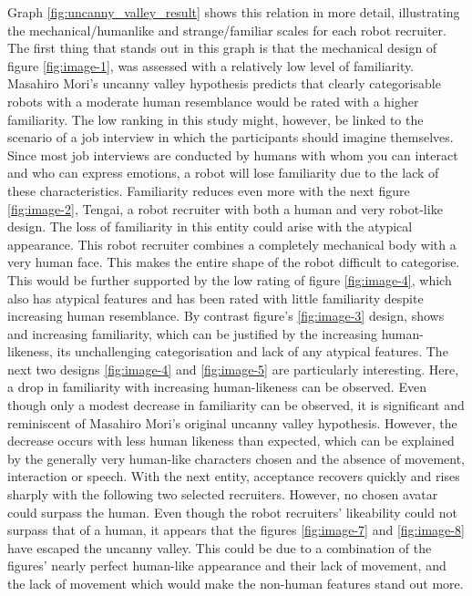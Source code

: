 Graph \ref{fig:uncanny_valley_result} shows this relation in more detail, illustrating the mechanical/humanlike and strange/familiar scales for each robot recruiter. The first thing that stands out in this graph is that the mechanical design of figure \ref{fig:image-1}, was assessed with a relatively low level of familiarity. Masahiro Mori's uncanny valley hypothesis predicts that clearly categorisable robots with a moderate human resemblance would be rated with a higher familiarity. The low ranking in this study might, however, be linked to the scenario of a job interview in which the participants should imagine themselves. Since most job interviews are conducted by humans with whom you can interact and who can express emotions, a robot will lose familiarity due to the lack of these characteristics. Familiarity reduces even more with the next figure \ref{fig:image-2}, Tengai, a robot recruiter with both a human and very robot-like design. The loss of familiarity in this entity could arise with the atypical appearance. This robot recruiter combines a completely mechanical body with a very human face. This makes the entire shape of the robot difficult to categorise. This would be further supported by the low rating of figure \ref{fig:image-4}, which also has atypical features and has been rated with little familiarity despite increasing human resemblance. By contrast figure's \ref{fig:image-3} design, shows and increasing familiarity, which can be justified by the increasing human-likeness, its unchallenging categorisation and lack of any atypical features. The next two designs \ref{fig:image-4} and \ref{fig:image-5} are particularly interesting. Here, a drop in familiarity with increasing human-likeness can be observed. Even though only a modest decrease in familiarity can be observed, it is significant and reminiscent of Masahiro Mori's original uncanny valley hypothesis. However, the decrease occurs with less human likeness than expected, which can be explained by the generally very human-like characters chosen and the absence of movement, interaction or speech. With the next entity, acceptance recovers quickly and rises sharply with the following two selected recruiters. However, no chosen avatar could surpass the human. Even though the robot recruiters' likeability could not surpass that of a human, it appears that the figures \ref{fig:image-7} and \ref{fig:image-8} have escaped the uncanny valley. This could be due to a combination of the figures' nearly perfect human-like appearance and their lack of movement, and the lack of movement which would make the non-human features stand out more.\\
